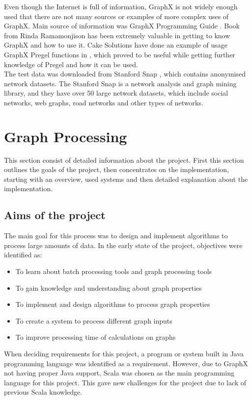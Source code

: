 \documentclass{article}
\theoremstyle{definition}
\begin{document}
Even though the Internet is full of information, GraphX is not widely enough used that there are not many sources or examples of more complex uses of GraphX. Main source of information was GraphX Programming Guide \cite{GraphX}. Book from Rinda Ramamonjison \cite{graphxbook} has been extremely valuable in getting to know GraphX and how to use it. Cake Solutions have done an example of usage GraphX Pregel functions in \cite{cakesolutions}, which proved to be useful while getting further knowledge of Pregel and how it can be used. \\

The test data was downloaded from Stanford Snap \cite{snap}, which contains anonymised network datasets. The Stanford Snap is a network analysis and graph mining library, and they have over 50 large network datasets, which include social networks, web graphs, road networks and other types of networks. \\

\section{Graph Processing}
This section consist of detailed information about the project. First this section outlines the goals of the project, then concentrates on the implementation, starting with an overview, used systems and then detailed explanation about the implementation. 

\subsection{Aims of the project}
The main goal for this process was to design and implement algorithms to process large amounts of data. In the early state of the project, objectives were identified as: 
\begin{itemize}
\item To learn about batch processing tools and graph processing tools
\item To gain knowledge and understanding about graph properties
\item To implement and design algorithms to process graph properties
\item To create a system to process different graph inputs
\item To improve processing time of calculations on graphs
\end{itemize}

When deciding requirements for this project, a program or system built in Java programming language was identified as a requirement. However, due to GraphX not having proper Java support, Scala was chosen as the main programming language for this project. This gave new challenges for the project due to lack of previous Scala knowledge. \\
\end{document}
